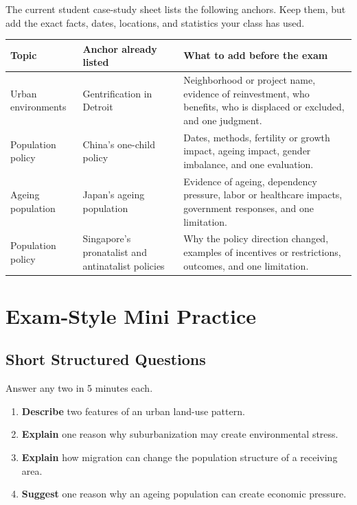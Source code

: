 \documentclass[11pt,a4paper]{article}
\newcommand{\exam}[1]{\textcolor{AccentTeal}{\textbf{#1}}}
\begin{document}
The current student case-study sheet lists the following anchors. Keep them, but
add the exact facts, dates, locations, and statistics your class has used.

\begin{tabularx}{\textwidth}{L{0.23\textwidth}Y Y}
\toprule
\textbf{Topic} & \textbf{Anchor already listed} & \textbf{What to add before the exam} \\
\midrule
Urban environments & Gentrification in Detroit & Neighborhood or project name,
evidence of reinvestment, who benefits, who is displaced or excluded, and one
judgment. \\
Population policy & China's one-child policy & Dates, methods, fertility or
growth impact, ageing impact, gender imbalance, and one evaluation. \\
Ageing population & Japan's ageing population & Evidence of ageing, dependency
pressure, labor or healthcare impacts, government responses, and one limitation. \\
Population policy & Singapore's pronatalist and antinatalist policies & Why the
policy direction changed, examples of incentives or restrictions, outcomes, and
one limitation. \\
\bottomrule
\end{tabularx}

\section{Exam-Style Mini Practice}

\subsection{Short Structured Questions}

Answer any two in 5 minutes each.

\begin{enumerate}
  \item \exam{Describe} two features of an urban land-use pattern.
  \item \exam{Explain} one reason why suburbanization may create environmental
  stress.
  \item \exam{Explain} how migration can change the population structure of a
  receiving area.
  \item \exam{Suggest} one reason why an ageing population can create economic
  pressure.
\end{enumerate}
\end{document}

